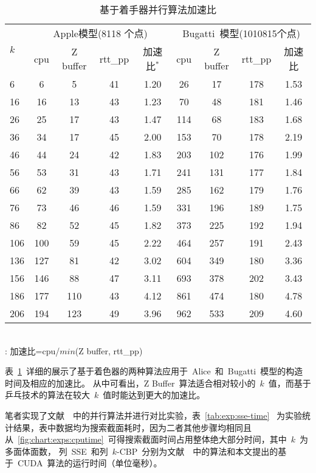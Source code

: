 \begin{table}
\centering
\caption{基于着手器并行算法加速比}
\label{tab:exper:shadertime}
\begin{minipage}[t]{0.8\textwidth}
  \begin{tabular}{p{1.5cm}<{\centering}cccc cccc} %
  \toprule[1.5pt]
  \multirow{2}{*}{$k$} & \multicolumn{4}{c}{Apple模型(8118 个点)} &
  \multicolumn{4}{c}{Bugatti~模型(1010815个点)}\\
  \cmidrule(lr){2-5}\cmidrule(lr){6-9}
  ~&cpu & Z buffer  & rtt\_pp & 加速比$^{*}$ & cpu  & Z buffer& rtt\_pp& 加速比 \\
  \midrule[1pt]
 6	 & 6 	& 5 	& 41 &	1.20 &	26	& 17	&178  &	1.53 \\
16	 & 16	& 13	& 43 &	1.23 &	70	& 48	&181  &	1.46 \\
26	 & 25	& 17	& 43 &	1.47 &	114	& 68	&183  &	1.68 \\
36	 & 34	& 17	& 45 &	2.00 &	153	& 70	&178  &	2.19 \\
46	 & 44	& 24	& 42 &	1.83 &	203	& 102	&176  &	1.99 \\
56	 & 53	& 31	& 43 &	1.71 &	241	& 131	&177  &	1.84 \\
66	 & 62	& 39	& 43 &	1.59 &	285	& 162	&179  &	1.76 \\
76	 & 73	& 46	& 46 &	1.59 &	331	& 196	&189  &	1.75 \\
86	 & 82	& 52	& 45 &	1.82 &	373	& 225	&192  &	1.94 \\
106	 & 100	& 59	& 45 &	2.22 &	464	& 257	&191  &	2.43 \\
136	 & 127	& 81	& 42 &	3.02 &	604	& 349	&180  &	3.36 \\
156	 & 146	& 88	& 47 &	3.11 &	693	& 378	&202  &	3.43 \\
186	 & 177	& 110	& 43 &	4.12 &	861	& 474	&180  &	4.78 \\
206	 & 194	& 123	& 49 &	3.96 &	962	& 533	&209  &	4.60 \\
  \bottomrule[1.5pt]
\end{tabular}\\[2pt]
  \footnotesize *: 加速比=cpu/$min$(Z buffer, rtt\_pp)
\end{minipage}
\end{table}

表~\ref{tab:exper:shadertime}~详细的展示了基于着色器的两种算法应用于~Alice~和~Bugatti~模型的构造时间及相应的加速比。
从中可看出，Z Buffer~算法适合相对较小的~$k$~值，而基于乒乓技术的算法在较大~$k$~值时能达到更大的加速比。

笔者实现了文献~~中的并行算法并进行对比实验，表~\ref{tab:exp:sse-time}
~为实验统计结果，表中数据均为搜索截面耗时，因为二者其他步骤均相同且从~\ref{fig:chart:exps:cputime}~可得搜索截面时间占用整体绝大部分时间，其中~$k$~为多面体面数，
列~SSE~和列~$k$-CBP~分别为文献~~中的算法和本文提出的基于~CUDA~算法的运行时间（单位毫秒）。

